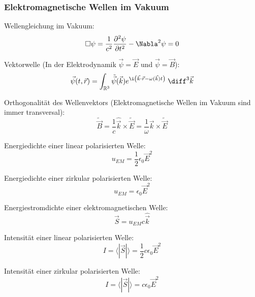 \documentclass[11pt]{article}
\numberwithin{equation}{section}
\begin{document}
      \subsubsection{Elektromagnetische Wellen im Vakuum}
        Wellengleichung im Vakuum:
        \begin{equation}
          \Box\psi = \frac{1}{c^2} \frac{\partial^2 \psi}{\partial t^2} - \Nabla^2 \psi = 0
        \end{equation}

        Vektorwelle (In der Elektrodynamik $\vec{\psi}=\vec{E}$ und $ \vec{\psi}=\vec{B}$):
        \begin{equation}
          \vec{\psi}(t,\vec{r}) = \int_{\mathbb{R}^3} \tilde{\vec{\psi}} (\vec{k}) e^{\i\left(\vec{k}\cdot\vec{r} - \omega(\vec{k})t \right)}\; \diff^3\vec{k}
        \end{equation}

        Orthogonalität des Wellenvektors (Elektromagnetische Wellen im Vakuum sind immer transversal):
        \begin{equation}
          \tilde{\vec{B}} = \frac{1}{c}\hat{\vec{k}}\times\tilde{\vec{E}} = \frac{1}{\omega}\vec{k}\times\tilde{\vec{E}}
        \end{equation}

        Energiedichte einer linear polarisierten Welle:
        \begin{equation}
          u_{EM} = \frac{1}{2}\epsilon_0\vec{E}^2
        \end{equation}

        Energiedichte einer zirkular polarisierten Welle:
        \begin{equation}
          u_{EM} = \epsilon_0\vec{E}^2
        \end{equation}

        Energiestromdichte einer elektromagnetischen Welle:
        \begin{equation}
          \vec{S} = u_{EM}c\hat{\vec{k}}
        \end{equation}

        Intensität einer linear polarisierten Welle:
        \begin{equation}
          I = \langle|\vec{S}|\rangle = \frac{1}{2}c\epsilon_0\vec{E}^2
        \end{equation}

        Intensität einer zirkular polarisierten Welle:
        \begin{equation}
          I = \langle|\vec{S}|\rangle = c\epsilon_0\vec{E}^2
        \end{equation}
\end{document}
